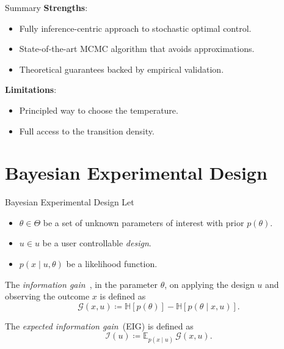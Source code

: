 \documentclass[10pt, aspectratio=1610]{beamer}
\begin{document}
    \begin{frame}{Summary}
      \textbf{Strengths}:\vspace{1em}
      \begin{itemize}
        \setlength\itemsep{1em}
        \item Fully inference-centric approach to stochastic optimal control.
        \item State-of-the-art MCMC algorithm that avoids approximations.
        \item Theoretical guarantees backed by empirical validation.
      \end{itemize}
      \vspace{1em}
      \textbf{Limitations}:\vspace{1em}
      \begin{itemize}
        \setlength\itemsep{1em}
        \item Principled way to choose the temperature.
        \item Full access to the transition density.
      \end{itemize}
    \end{frame}

    \section{Bayesian Experimental Design}
    \begin{frame}{Bayesian Experimental Design}
      Let
      \begin{itemize}
        \item $\theta \in \Theta$ be a set of unknown parameters of interest with prior $p(\theta)$.
        \item $u \in u$ be a user controllable \emph{design}.
        \item $p(x \mid u, \theta)$ be a likelihood function.
      \end{itemize}
      
      \pause
      \begin{definition}
        The \emph{information gain}~\citep[IG,][]{lindley1956measure}, in the parameter $\theta$, on applying the design $u$ and observing the outcome $x$ is defined as
        \begin{equation}\label{eq:ig_single_experiment}
          \mathcal{G}(x, u) \coloneq \mathbb{H}[p(\theta)] - \mathbb{H}[p(\theta\mid x, u)].
        \end{equation}
      \end{definition}

      \pause
      \begin{definition}
        The \emph{expected information gain}~(EIG) is defined as
        \begin{equation}
          \mathcal{I}(u) \coloneq \mathbb{E}_{p(x \mid u)} \, \mathcal{G}(x, u).
        \end{equation}
      \end{definition}
    \end{frame}
\end{document}
